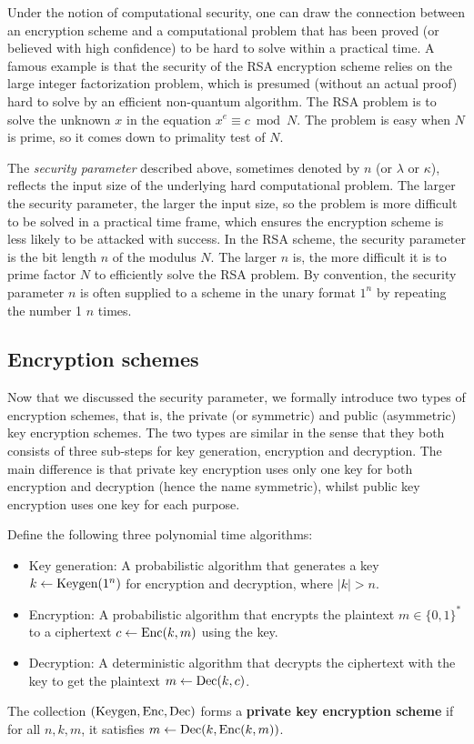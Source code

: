 \documentclass[../main.tex]{subfiles}
\begin{document}
Under the notion of computational security, one can draw the connection between an encryption scheme and a computational problem that has been proved (or believed with high confidence) to be hard to solve within a practical time. A famous example is that the security of the RSA encryption scheme relies on the large integer factorization problem, which is presumed (without an actual proof) hard to solve by an efficient non-quantum algorithm. The RSA problem is to solve the unknown $x$ in the equation $x^e \equiv c \bmod N$. The problem is easy when $N$ is prime, so it comes down to primality test of $N$.    

The \textit{security parameter}  described above, sometimes denoted by $n$ (or $\lambda$ or $\kappa$), reflects the input size of the underlying hard computational problem. The larger the security parameter, the larger the input size, so the problem is more difficult to be solved in a practical time frame, which ensures the encryption scheme is less likely to be attacked with success. In the RSA scheme, the security parameter is the bit length $n$ of the modulus $N$. The larger $n$ is, the more difficult it is to prime factor $N$ to efficiently solve the RSA problem. By convention, the security parameter $n$ is often supplied to a scheme in the unary format $1^n$ by repeating the number 1 $n$ times. 
\subsection{Encryption schemes}
Now that we discussed the security parameter, we formally introduce two types of encryption schemes, that is, the private (or symmetric) and public (asymmetric) key encryption schemes. The two types are similar in the sense that they both consists of three sub-steps for key generation, encryption and decryption. The main difference is that private key encryption uses only one key for both encryption and decryption (hence the name symmetric), whilst public key encryption uses one key for each purpose.

\begin{definition}
	Define the following three polynomial time algorithms: 
	\begin{itemize}
		\item Key generation: A probabilistic algorithm that generates a key $k \leftarrow \text{Keygen}(1^n)$ for encryption and decryption, where $|k| > n$.   
		\item Encryption: A probabilistic algorithm that encrypts the plaintext $m \in \{0, 1\}^*$ to a ciphertext $c \leftarrow \text{Enc}(k, m)$ using the key.
		\item Decryption: A deterministic algorithm that decrypts the ciphertext with the key to get the plaintext  $m \leftarrow \text{Dec}(k,c)$.
	\end{itemize} 
	The collection $(\text{Keygen}, \text{Enc}, \text{Dec})$ forms a \textbf{private key encryption scheme}  if for all $n, k, m$, it satisfies $m \leftarrow \text{Dec}(k,\text{Enc}(k,m))$.
\end{definition}
\end{document}
